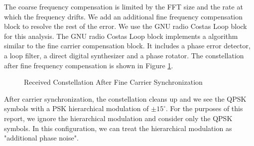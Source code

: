 \documentclass[conference,onecolumn]{IEEEtran}
\begin{document}
The coarse frequency compensation is limited by the FFT size and the rate at which the frequency drifts. We add an additional fine frequency compensation block to resolve the rest of the error. We use the GNU radio Costas Loop block for this analysis. The GNU radio Costas Loop block implements a algorithm similar to the fine carrier compensation block. It includes a phase error detector, a loop filter, a direct digital synthesizer and a phase rotator. The constellation after fine frequency compensation is shown in Figure \ref{fig::constellation_after_fine_carrier_comp}.

\begin{figure}[H]
	\centerline{}
	\caption{Received Constellation After Fine Carrier Synchronization}
	\label{fig::constellation_after_fine_carrier_comp}
\end{figure}

\noindent After carrier synchronization, the constellation cleans up and we see the QPSK symbols with a PSK hierarchical modulation of $\pm15^{\circ}$. For the purposes of this report, we ignore the hierarchical modulation and consider only the QPSK symbols. In this configuration, we can treat the hierarchical modulation as "additional phase noise".


\end{document}
